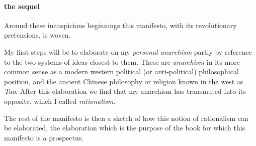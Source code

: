 
\paragraph{the sequel}

Around these inauspicious beginnings this manifesto, with its revolutionary pretensions, is woven.

My first steps will be to elaborate on my {\it personal anarchism} partly by reference to the two systems of ideas closest to them.
These are {\it anarchism} in its more common sense as a modern western political (or anti-political) philosophical position, and the ancient Chinese philosophy or religion known in the west as {\it Tao}.
After this elaboration we find that my anarchism has transmuted into its opposite, which I called {\it rationalism}.

The rest of the manifesto is then a sketch of how this notion of rationalism can be elaborated, the elaboration which is the purpose of the book for which this manifesto is a prospectus. 